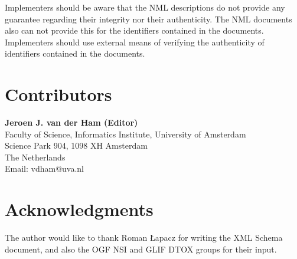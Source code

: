 \documentclass[12pt]{article}  %
\begin{document}
Implementers should be aware that the NML descriptions do not provide any guarantee regarding their integrity nor their authenticity. The NML documents also can not provide this for the identifiers contained in the documents. Implementers should use external means of verifying the authenticity of identifiers contained in the documents.

\section{Contributors}

% 
% 
% 

\textbf{Jeroen J. van der Ham (Editor)} \\
Faculty of Science, Informatics Institute, University of Amsterdam \\
Science Park 904, 1098 XH  Amsterdam  \\
The Netherlands \\
Email: vdham@uva.nl \\
\section{Acknowledgments}

The author would like to thank Roman Łapacz for writing the XML Schema document, and also the OGF NSI and GLIF DTOX groups for their input.


 
 
\end{document}
